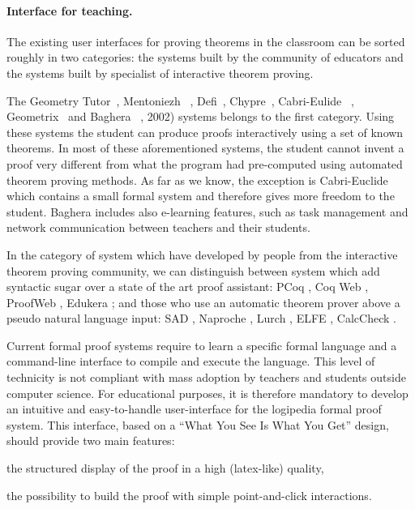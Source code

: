 \paragraph*{Interface for teaching.}

The existing user interfaces for proving theorems in the classroom can be sorted roughly in two categories: 
the systems built by the community of educators and the systems built by specialist of interactive theorem proving.

The Geometry Tutor~\cite{anderson_geometry_1985}, Mentoniezh
~\cite{py_reconnaissance_1990},
Defi~\cite{ag-almouloud_ordinateur_1992},
Chypre~\cite{bernat_chypre:_1993}, Cabri-Eulide
~\cite{luengo_cabri-euclide:_1997},
Geometrix~\cite{gressier_geometrix_1988} and Baghera
~\cite{balacheff_baghera_1999}, 2002) systems belongs to the first
category. Using these systems the student can produce proofs
interactively using a set of known theorems.  In most of these
aforementioned systems, the student cannot invent a proof very
different from what the program had pre-computed using automated
theorem proving methods. As far as we know, the exception is
Cabri-Euclide which contains a small formal system and therefore gives
more freedom to the student. Baghera includes also e-learning
features, such as task management and network communication between
teachers and their students.

In the category of system which have developed by people from the
interactive theorem proving community, we can distinguish between
system which add syntactic sugar over a state of the art proof
assistant: PCoq \cite{amerkad_mathematics_2001}, Coq Web
\cite{blanc_proofs_2007}, ProofWeb \cite{kaliszyk_deduction_2008},
Edukera \cite{rognier_presentation_2016}; and those who use an
automatic theorem prover above a pseudo natural language input: SAD
\cite{lyaletski_sad_2006}, Naproche \cite{cramer_naproche_2010}, Lurch
\cite{carter_lurch:_nodate}, ELFE \cite{dore_elfe_2018}, CalcCheck
\cite{kahl_calccheck:_2018}.

Current formal proof systems require to learn a specific formal
language and a command-line interface to compile and execute the
language. This level of technicity is not compliant with mass adoption
by teachers and students outside computer science. For educational
purposes, it is therefore mandatory to develop an intuitive and
easy-to-handle user-interface for the logipedia formal proof
system. This interface, based on a ``What You See Is What You Get''
design, should provide two main features:
\begin{compactitem}
\item the structured display of the proof in a high (latex-like) quality,
\item the possibility to build the proof with simple point-and-click
  interactions.
\end{compactitem}

